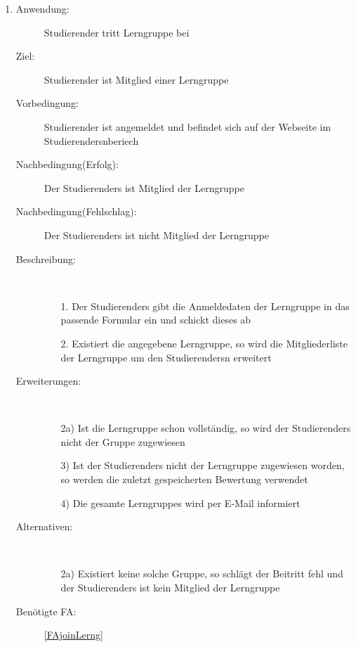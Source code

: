 \documentclass[parskip=full]{scrartcl}
\newcommand{\swtLabel}[1]{\textbf{/#1\arabic*0/}}
\begin{document}
\begin{enumerate}[label=\swtLabel{S}]
  
  \item \label{UCstudJoinLernG}
  \begin{description}
  \item[Anwendung:] \gls{Studierender} tritt \gls{Lerngruppe} bei
  \item[Ziel:] \gls{Studierender} ist Mitglied einer \gls{Lerngruppe}
  	\item[Vorbedingung:] \gls{Studierender} ist angemeldet und befindet sich auf der
  	Webseite im \glspl{Studierender}nberiech
  	\item[Nachbedingung(Erfolg):] Der \glspl{Studierender} ist Mitglied der
  	\gls{Lerngruppe}
  	\item[Nachbedingung(Fehlschlag):] Der \glspl{Studierender} ist nicht Mitglied der
  	\gls{Lerngruppe}
  	\item[Beschreibung:]~
  	\begin{enumerate}
  	  \item[1.] Der \glspl{Studierender} gibt die Anmeldedaten der \gls{Lerngruppe} in das
  	  passende Formular ein und schickt dieses ab %
  	  \item[2.] Existiert die angegebene \gls{Lerngruppe}, so wird die
  	  Mitgliederliste der \gls{Lerngruppe} um den \glspl{Studierender}n erweitert
  	\end{enumerate}
  	\item[Erweiterungen:]~
  	\begin{enumerate}
  	  \item[2a)] Ist die \gls{Lerngruppe} schon vollständig, so wird der
  	  \glspl{Studierender} nicht der Gruppe zugewiesen
  	  \item[3)] Ist der \glspl{Studierender} nicht der \gls{Lerngruppe} zugewiesen worden,
  	  so werden die zuletzt gespeicherten \gls{Bewertung} verwendet
  	  \item[4)] Die gesamte \glspl{Lerngruppe} wird per E-Mail informiert
  	 \end{enumerate}
  	\item[Alternativen:] ~
  	\begin{enumerate}
  	  \item[2a)] Existiert keine solche Gruppe, so schlägt der Beitritt fehl und
  	  der \glspl{Studierender} ist kein Mitglied der \gls{Lerngruppe}
  	 \end{enumerate}
  	 \item[Benötigte FA:] \ref{FAjoinLerng}
  \end{description}
  

\end{enumerate}
\end{document}
